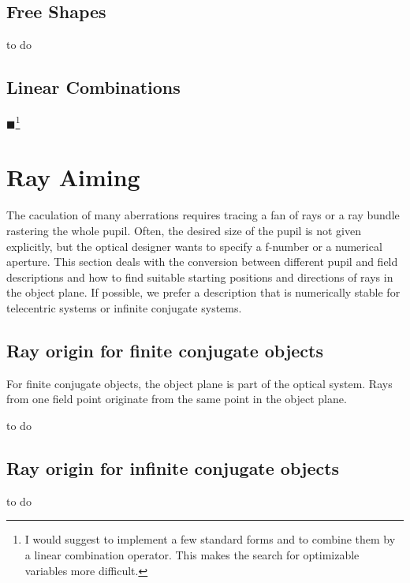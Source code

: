 \documentclass[12pt,a4paper,twoside,openright,BCOR10mm,headsepline,titlepage,abstracton,chapterprefix,final]{scrreprt}
\newcommand{\remark}[1]{{\color{red}$\blacksquare$}\footnote{{\color{red}#1}}}
\begin{document}
\subsection{Free Shapes}
to do

\subsection{Linear Combinations}
\remark{I would suggest to implement a few standard forms and to combine them by a linear combination operator. This makes the search for optimizable
variables more difficult.}




\section{Ray Aiming}
The caculation of many aberrations requires tracing a fan of rays or a ray bundle rastering the whole pupil.
Often, the desired size of the pupil is not given explicitly, but the optical designer wants to specify a f-number or a numerical aperture.
This section deals with the conversion between different pupil and field descriptions and how to find suitable starting positions and directions of rays in the object plane.
If possible, we prefer a description that is numerically stable for telecentric systems or infinite conjugate systems.

\subsection{Ray origin for finite conjugate objects}
For finite conjugate objects, the object plane is part of the optical system. Rays from one field point originate from the same point in the object plane.

to do

\subsection{Ray origin for infinite conjugate objects}
to do
\end{document}
